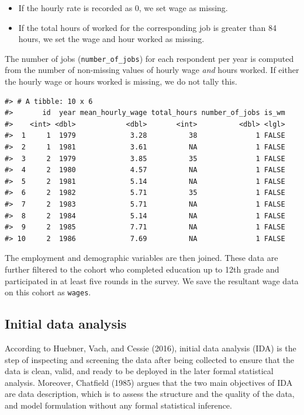 \documentclass{article}
\providecommand{\tightlist}{%
  \setlength{\itemsep}{0pt}\setlength{\parskip}{0pt}}
\begin{document}
\begin{itemize}
\tightlist
\item
  If the hourly rate is recorded as 0, we set wage as missing.
\item
  If the total hours of worked for the corresponding job is greater than 84 hours, we set the wage and hour worked as missing.
\end{itemize}

The number of jobs (\texttt{number\_of\_jobs}) for each respondent per year is computed from the number of non-missing values of hourly wage \emph{and} hours worked. If either the hourly wage or hours worked is missing, we do not tally this.

\begin{verbatim}
#> # A tibble: 10 x 6
#>       id  year mean_hourly_wage total_hours number_of_jobs is_wm
#>    <int> <dbl>            <dbl>       <int>          <dbl> <lgl>
#>  1     1  1979             3.28          38              1 FALSE
#>  2     1  1981             3.61          NA              1 FALSE
#>  3     2  1979             3.85          35              1 FALSE
#>  4     2  1980             4.57          NA              1 FALSE
#>  5     2  1981             5.14          NA              1 FALSE
#>  6     2  1982             5.71          35              1 FALSE
#>  7     2  1983             5.71          NA              1 FALSE
#>  8     2  1984             5.14          NA              1 FALSE
#>  9     2  1985             7.71          NA              1 FALSE
#> 10     2  1986             7.69          NA              1 FALSE
\end{verbatim}

The employment and demographic variables are then joined. These data are further filtered to the cohort who completed education up to 12th grade and participated in at least five rounds in the survey. We save the resultant wage data on this cohort as \texttt{wages}.

\hypertarget{ida}{%
\subsection{Initial data analysis}\label{ida}}

According to Huebner, Vach, and Cessie (2016), initial data analysis (IDA) is the step of inspecting and screening the data after being collected to ensure that the data is clean, valid, and ready to be deployed in the later formal statistical analysis. Moreover, Chatfield (1985) argues that the two main objectives of IDA are data description, which is to assess the structure and the quality of the data, and model formulation without any formal statistical inference.
\end{document}
